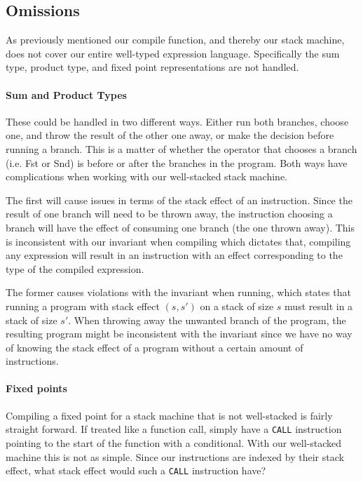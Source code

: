 \subsection{Omissions}
\label{sec:omissions}
As previously mentioned our compile function, and thereby our stack machine, does not cover our entire well-typed expression language. Specifically the sum type, product type, and fixed point representations are not handled. 

\paragraph{Sum and Product Types}
These could be handled in two different ways. Either run both branches, choose one, and throw the result of the other one away, or make the decision before running a branch. This is a matter of whether the operator that chooses a branch (i.e. Fst or Snd) is before or after the branches in the program. Both ways have complications when working with our well-stacked stack machine. 

The first will cause issues in terms of the stack effect of an instruction. Since the result of one branch will need to be thrown away, the instruction choosing a branch will have the effect of consuming one branch (the one thrown away). This is inconsistent with our invariant when compiling which dictates that, compiling any expression will result in an instruction with an effect corresponding to the type of the compiled expression. 

The former causes violations with the invariant when running, which states that running a program with stack effect $(s, s')$ on a stack of size $s$ must result in a stack of size $s'$. When throwing away the unwanted branch of the program, the resulting program might be inconsistent with the invariant since we have no way of knowing the stack effect of a program without a certain amount of instructions. %

\paragraph{Fixed points}
Compiling a fixed point for a stack machine that is not well-stacked is fairly straight forward. If treated like a function call, simply have a \texttt{CALL} instruction pointing to the start of the function with a conditional. With our well-stacked machine this is not as simple. Since our instructions are indexed by their stack effect, what stack effect would such a \texttt{CALL} instruction have? 

